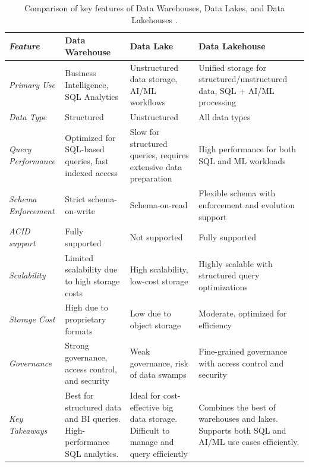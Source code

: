 \begin{table}[!h]
    \centering
    \caption[Comparison of data architectures]{Comparison of key features of Data Warehouses, Data Lakes, and Data Lakehouses \cite{inmonFiveStepsSuccessful}.}
    \label{tab:DBMS_comparison}
    \begin{tabular}{|p{2.2cm}|p{3cm}|p{2.9cm}|p{3cm}|}
        \hline
        \textit{\textbf{Feature}} & \textbf{Data Warehouse} & \textbf{Data Lake} & \textbf{Data Lakehouse} \\
        \hline
        \textit{Primary Use} & Business Intelligence, \gls{SQL} Analytics & Unstructured data storage, \gls{AI}/\gls{ML} workflows & Unified storage for structured/unstructured data, \gls{SQL} + \gls{AI}/\gls{ML} processing \\
        \hline
        \textit{Data Type} & Structured & Unstructured & All data types \\
        \hline
        \textit{Query Performance} & Optimized for \gls{SQL}-based queries, fast indexed access & Slow for structured queries, requires extensive data preparation & High performance for both \gls{SQL} and \gls{ML} workloads \\
        \hline
        \textit{Schema Enforcement} & Strict schema-on-write & Schema-on-read & Flexible schema with enforcement and evolution support \\
        \hline
        \textit{\gls{ACID} support} & Fully supported & Not supported & Fully supported \\
        \hline
        \textit{Scalability} & Limited scalability due to high storage costs & High scalability, low-cost storage & Highly scalable with structured query optimizations \\
        \hline
        \textit{Storage Cost} & High due to proprietary formats & Low due to object storage & Moderate, optimized for efficiency \\
        \hline
        \textit{Governance} & Strong governance, access control, and security & Weak governance, risk of data swamps & Fine-grained governance with access control and security \\
        \hline
        \textit{Key Takeaways} & Best for structured data and BI queries. High-performance \gls{SQL} analytics. & Ideal for cost-effective big data storage. Difficult to manage and query efficiently & Combines the best of warehouses and lakes. Supports both \gls{SQL} and \gls{AI}/\gls{ML} use cases efficiently. \\
        \hline
    \end{tabular}
\end{table}



